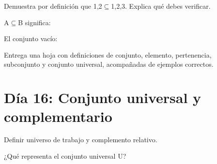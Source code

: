 \begin{activity}[id=dia-15-desarrollo-02,type=long,weight=2]

Demuestra por definición que {1,2}\(\subseteq\){1,2,3}. Explica qué debes verificar.

\end{activity}

\begin{activity}[id=dia-15-opcion-01,type=choice,weight=1]

A\(\subseteq\)B significa:





\end{activity}

\begin{activity}[id=dia-15-opcion-02,type=choice,weight=1]

El conjunto vacío:





\end{activity}

\begin{deliverable}[id=entrega-dia-15,type=upload,weight=3]

Entrega una hoja con definiciones de conjunto, elemento, pertenencia, subconjunto y conjunto universal, acompañadas de ejemplos correctos.

\end{deliverable}

\section{Día 16: Conjunto universal y complementario}

\begin{lesson}[id=dia-16-lectura,weight=0]

Definir universo de trabajo y complemento relativo.

\end{lesson}

\begin{activity}[id=dia-16-corta-01,type=short,weight=1]

¿Qué representa el conjunto universal U?

\end{activity}

